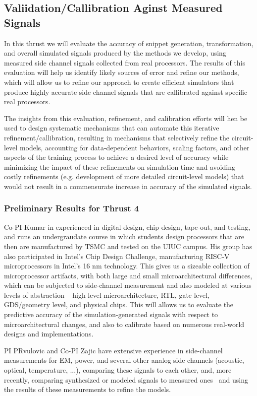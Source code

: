 \subsection{Valiidation/Callibration Aginst Measured Signals}

In this thrust we will evaluate the accuracy of snippet generation, transformation, and overall simulated signals produced by the methods we develop, using measured side channel signals collected from real processors. The results of this evaluation will help us identify likely sources of error and refine our methods, which will allow us to refine our approach to create efficient simulators that produce highly accurate side channel signals that are callibrated against specific real processors.

The insights from this evaluation, refinement, and calibration efforts will hen be used to design systematic mechanisms that can automate this iterative refinement/callibration, resulting in mechanisms that selectively refine the circuit-level models, accounting for data-dependent behaviors, scaling factors, and other aspects of the training process to achieve a desired level of accuracy while minimizing the impact of these refinements on simulation time and avoiding costly refinements (e.g. development of more detailed circuit-level models) that would not result in a commensurate increase in accuracy of the simulated signals.

\subsubsection{Preliminary Results for Thrust 4}

Co-PI Kumar in experienced in digital design, chip design,
tape-out, and testing, and runs an undergraudate course in which students design processors that are then are manufactured by TSMC and tested on the UIUC campus.
His group has also participated in Intel's Chip Design Challenge, manufacturing RISC-V microprocessors in Intel's 16 nm technology. This gives us a sizeable collection of microprocessor artifacts, with both large and small microarchitectural differences,
which can be subjected to side-channel measurement and also modeled at various levels of abstraction -- high-level microarchitecture, RTL, gate-level,
GDS/geometry level, and physical chips. This will allows us to evaluate the predictive accuracy of the simulation-generated signals with respect to microarchitectural changes,
and also to calibrate based on numerous real-world designs and implementations.

PI PRvulovic and Co-PI Zajic have extensive experience in side-channel measurements for EM, power, and several other analog side channels (acoustic, optical, temperature, ...), comparing these signals to each other, and, more recently, comparing synthesized or modeled signals to measured ones~\cite{Nader2020} and using the results of these measurements to refine the models. 